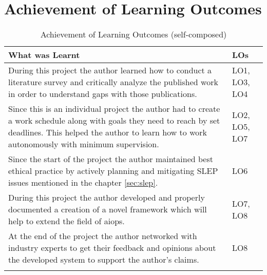 \section{Achievement of Learning Outcomes}

\begin{longtable}{|p{135mm}|p{25mm}|}
    \hline
    \textbf{What was Learnt} & \textbf{LOs} \\ \hline
    During this project the author learned how to conduct a literature survey and critically analyze the published work in order to understand gaps with those publications. & LO1, LO3, LO4 \\ \hline
    Since this is an individual project the author had to create a work schedule along with goals they need to reach by set deadlines. This helped the author to learn how to work autonomously with minimum supervision. & LO2, LO5, LO7 \\ \hline
    Since the start of the project the author maintained best ethical practice by actively planning and mitigating SLEP issues mentioned in the chapter \ref{sec:slep}. & LO6 \\ \hline
    During this project the author developed and properly documented a creation of a novel framework which will help to extend the field of \ac{aiops}. & LO7, LO8 \\ \hline
    At the end of the project the author networked with industry experts to get their feedback and opinions about the developed system to support the author's claims. & LO8 \\ \hline
    \caption{Achievement of Learning Outcomes (self-composed)}
  \end{longtable}
  